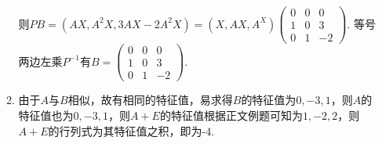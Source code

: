 \begin{enumerate}
\begin{enumerate}
        则$PB=(AX,A^2X,3AX-2A^2X)=(X,AX,A^X)\begin{pmatrix}
            0 & 0 & 0 \\ 1 & 0 & 3 \\ 0 & 1 & -2
        \end{pmatrix}$. 等号两边左乘$P^{-1}$有$B=\begin{pmatrix}
            0 & 0 & 0 \\ 1 & 0 & 3 \\ 0 & 1 & -2
        \end{pmatrix}$.
        \item 由于$A$与$B$相似，故有相同的特征值，易求得$B$的特征值为$0,-3,1$，则$A$的特征值也为$0,-3,1$，则$A+E$的特征值根据正文例题可知为$1,-2,2$，则$A+E$的行列式为其特征值之积，即为-4.
    \end{enumerate}

\end{enumerate}

